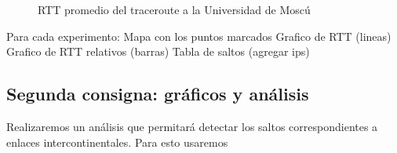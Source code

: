 \begin{figure}[H]
  \centering
  \caption{RTT promedio del traceroute a la Universidad de Moscú}
  \label{rusiaTTL}
  
\end{figure}

	
	Para cada experimento:
		Mapa con los puntos marcados
		Grafico de RTT (lineas)
		Grafico de RTT relativos (barras)
		Tabla de saltos (agregar ips)

		
		
\subsection{Segunda consigna: gráficos y análisis}


Realizaremos un análisis que permitará detectar los saltos correspondientes a enlaces intercontinentales. Para esto usaremos 

